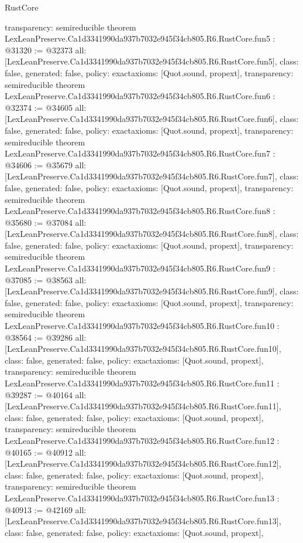 \begin{lexlean}{RustCore}
\begin{coremodule}
{  transparency: semireducible
}
theorem LexLeanPreserve.Ca1d3341990da937b7032e945f34cb805.R6.RustCore.fun5 : @31320 := @32373 {
  all: [LexLeanPreserve.Ca1d3341990da937b7032e945f34cb805.R6.RustCore.fun5],
  class: false,
  generated: false,
  policy: exact{axioms: [Quot.sound, propext]},
  transparency: semireducible
}
theorem LexLeanPreserve.Ca1d3341990da937b7032e945f34cb805.R6.RustCore.fun6 : @32374 := @34605 {
  all: [LexLeanPreserve.Ca1d3341990da937b7032e945f34cb805.R6.RustCore.fun6],
  class: false,
  generated: false,
  policy: exact{axioms: [Quot.sound, propext]},
  transparency: semireducible
}
theorem LexLeanPreserve.Ca1d3341990da937b7032e945f34cb805.R6.RustCore.fun7 : @34606 := @35679 {
  all: [LexLeanPreserve.Ca1d3341990da937b7032e945f34cb805.R6.RustCore.fun7],
  class: false,
  generated: false,
  policy: exact{axioms: [Quot.sound, propext]},
  transparency: semireducible
}
theorem LexLeanPreserve.Ca1d3341990da937b7032e945f34cb805.R6.RustCore.fun8 : @35680 := @37084 {
  all: [LexLeanPreserve.Ca1d3341990da937b7032e945f34cb805.R6.RustCore.fun8],
  class: false,
  generated: false,
  policy: exact{axioms: [Quot.sound, propext]},
  transparency: semireducible
}
theorem LexLeanPreserve.Ca1d3341990da937b7032e945f34cb805.R6.RustCore.fun9 : @37085 := @38563 {
  all: [LexLeanPreserve.Ca1d3341990da937b7032e945f34cb805.R6.RustCore.fun9],
  class: false,
  generated: false,
  policy: exact{axioms: [Quot.sound, propext]},
  transparency: semireducible
}
theorem LexLeanPreserve.Ca1d3341990da937b7032e945f34cb805.R6.RustCore.fun10 : @38564 := @39286 {
  all: [LexLeanPreserve.Ca1d3341990da937b7032e945f34cb805.R6.RustCore.fun10],
  class: false,
  generated: false,
  policy: exact{axioms: [Quot.sound, propext]},
  transparency: semireducible
}
theorem LexLeanPreserve.Ca1d3341990da937b7032e945f34cb805.R6.RustCore.fun11 : @39287 := @40164 {
  all: [LexLeanPreserve.Ca1d3341990da937b7032e945f34cb805.R6.RustCore.fun11],
  class: false,
  generated: false,
  policy: exact{axioms: [Quot.sound, propext]},
  transparency: semireducible
}
theorem LexLeanPreserve.Ca1d3341990da937b7032e945f34cb805.R6.RustCore.fun12 : @40165 := @40912 {
  all: [LexLeanPreserve.Ca1d3341990da937b7032e945f34cb805.R6.RustCore.fun12],
  class: false,
  generated: false,
  policy: exact{axioms: [Quot.sound, propext]},
  transparency: semireducible
}
theorem LexLeanPreserve.Ca1d3341990da937b7032e945f34cb805.R6.RustCore.fun13 : @40913 := @42169 {
  all: [LexLeanPreserve.Ca1d3341990da937b7032e945f34cb805.R6.RustCore.fun13],
  class: false,
  generated: false,
  policy: exact{axioms: [Quot.sound, propext]},
}
\end{coremodule}
\end{lexlean}
